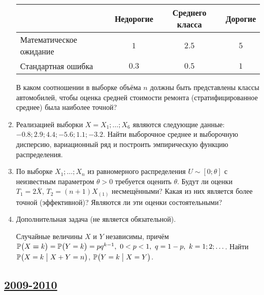 \begin{enumerate}
\begin{center}
\begin{tabular}{@{}lccc@{}}
\toprule
                        & Недорогие & Среднего класса & Дорогие \\ \midrule
Математическое ожидание & $1$       & $2.5$           & $5$     \\
Стандартная ошибка      & $0.3$     & $0.5$           & $1$     \\ \bottomrule
\end{tabular}
\end{center}

В каком соотношении в выборке объёма $n$ должны быть представлены классы автомобилей,
чтобы оценка средней стоимости ремонта (стратифицированное среднее) была наиболее точной?
\item Реализацией выборки $X=X_1;\ldots;X_6$ являются следующие данные:
$-0.8; 2.9; 4.4; -5.6; 1.1; -3.2$. Найти выборочное среднее и выборочную дисперсию,
вариационный ряд и построить эмпирическую функцию распределения.
\item По выборке $X_1;\ldots;X_n$ из равномерного распределения $U\sim[0;\theta]$
с неизвестным параметром $\theta >0$ требуется оценить $\theta$. Будут ли оценки
$T_1=2\bar{X}$, $T_2=(n+1)X_{(1)}$ несмещёнными? Какая из них является более точной
(эффективной)? Являются ли эти оценки состоятельными?

\item Дополнительная задача (не является обязательной).

Случайные величины $X$ и $Y$ независимы, причём $\P\bigl(X \hm = k \bigr) =
\P\bigl(Y = k\bigr) = pq^{k-1},\ 0<p<1,\ q=1-p,\ k=1;2;\ldots$. Найти
$\P\bigl(X=k \bigm| X+Y=n\bigr)$, $\P\bigl(Y=k\bigm| X=Y\bigr)$.
\end{enumerate}



\newpage
\subsection[2009-2010]{\hyperref[sec:sol_kr_01_2009_2010]{2009-2010}}
\label{sec:kr_01_2009_2010}

